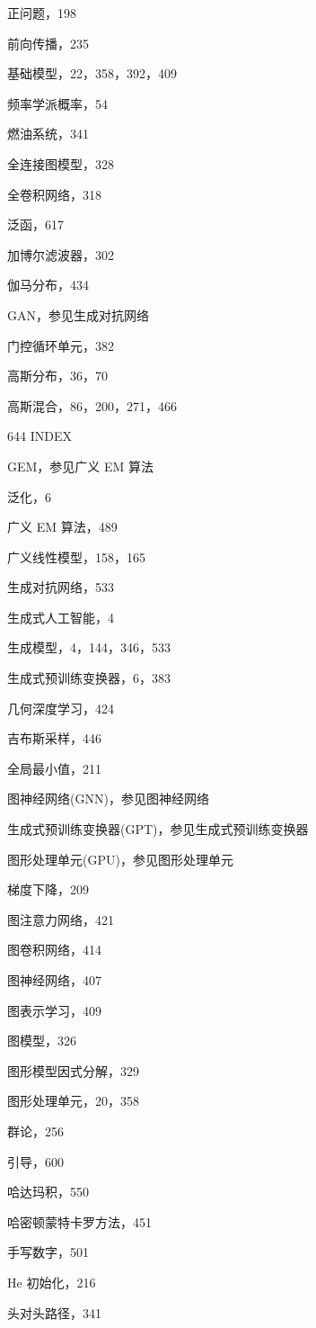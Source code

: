 \documentclass[10pt]{report}
\begin{document}
正问题，198

前向传播，235

基础模型，22，358，392，409

频率学派概率，54

燃油系统，341

全连接图模型，328

全卷积网络，318

泛函，617

加博尔滤波器，302

伽马分布，434

GAN，参见生成对抗网络

门控循环单元，382

高斯分布，36，70

高斯混合，86，200，271，466

644 INDEX

GEM，参见广义 EM 算法

泛化，6

广义 EM 算法，489

广义线性模型，158，165

生成对抗网络，533

生成式人工智能，4

生成模型，4，144，346，533

生成式预训练变换器，6，383

几何深度学习，424

吉布斯采样，446

全局最小值，211

图神经网络(GNN)，参见图神经网络

生成式预训练变换器(GPT)，参见生成式预训练变换器

图形处理单元(GPU)，参见图形处理单元

梯度下降，209

图注意力网络，421

图卷积网络，414

图神经网络，407

图表示学习，409

图模型，326

图形模型因式分解，329

图形处理单元，20，358

群论，256

引导，600

哈达玛积，550

哈密顿蒙特卡罗方法，451

手写数字，501

He 初始化，216

头对头路径，341
\end{document}
